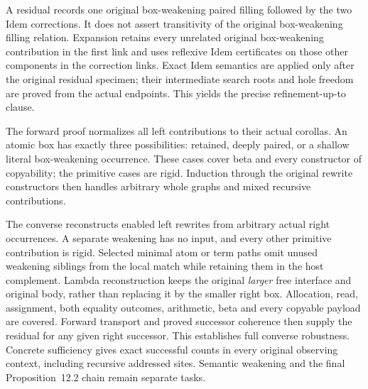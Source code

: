 A residual records one original box-weakening paired filling followed by
the two Idem corrections. It does not assert transitivity of the original
box-weakening filling relation. Expansion retains every unrelated original
box-weakening contribution in the first link and uses reflexive Idem
certificates on those other components in the correction links. Exact Idem
semantics are applied only after the original residual specimen; their
intermediate search roots and hole freedom are proved from the actual
endpoints. This yields the precise refinement-up-to clause.

The forward proof normalizes all left contributions to their actual
corollas. An atomic box has exactly three possibilities: retained, deeply
paired, or a shallow literal box-weakening occurrence. These cases cover
beta and every constructor of copyability; the primitive cases are rigid.
Induction through the original rewrite constructors then handles arbitrary
whole graphs and mixed recursive contributions.

The converse reconstructs enabled left rewrites from arbitrary actual
right occurrences. A separate weakening has no input, and every other
primitive contribution is rigid. Selected minimal atom or term paths omit
unused weakening siblings from the local match while retaining them in the
host complement. Lambda reconstruction keeps the original \emph{larger}
free interface and original body, rather than replacing it by the smaller
right box. Allocation, read, assignment, both equality outcomes, arithmetic,
beta and every copyable payload are covered. Forward transport and proved
successor coherence then supply the residual for any given right successor.
This establishes full converse robustness. Concrete sufficiency gives exact
successful counts in every original observing context, including recursive
addressed sites. Semantic weakening and the final Proposition~12.2 chain
remain separate tasks.


\par{}


